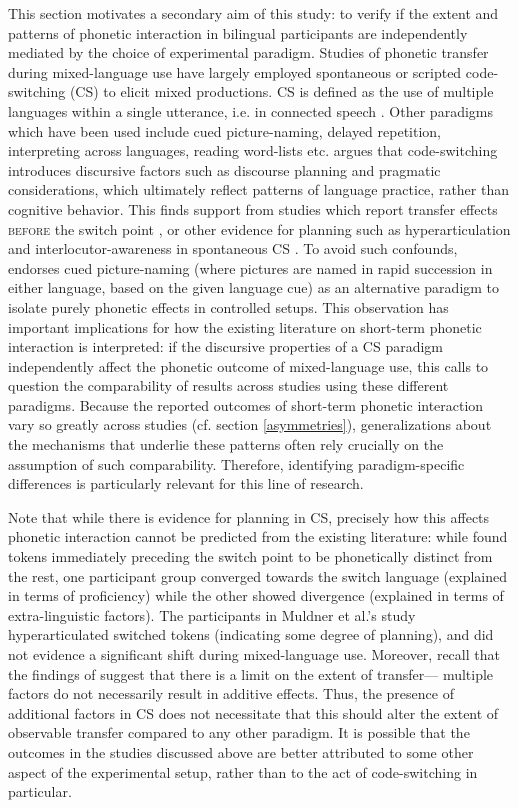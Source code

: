 \documentclass[12 pt]{article}
\begin{document}
This section motivates a secondary aim of this study: to verify if the extent and patterns of phonetic interaction in bilingual participants are independently mediated by the choice of experimental paradigm. Studies of phonetic transfer during mixed-language use have largely employed spontaneous or scripted code-switching (CS) to elicit mixed productions. CS is defined as the use of multiple languages within a single utterance, i.e. in connected speech \citep{myers1993dueling}. Other paradigms which have been used include cued picture-naming, delayed repetition, interpreting across languages, reading word-lists etc. \cite{olson2013bilingual} argues that code-switching introduces discursive factors such as discourse planning and pragmatic considerations, which ultimately reflect patterns of language practice, rather than cognitive behavior. This finds support from studies which report transfer effects \textsc{before} the switch point \citep{bullock2009trying}, or other evidence for planning such as hyperarticulation \citep{muldner2019phonetics} and interlocutor-awareness in spontaneous CS \citep{khattab2013phonetic}. To avoid such confounds, \cite{olson2013bilingual} endorses cued picture-naming (where pictures are named in rapid succession in either language, based on the given language cue) as an alternative paradigm to isolate purely phonetic effects in controlled setups. This observation has important implications for how the existing literature on short-term phonetic interaction is interpreted: if the discursive properties of a CS paradigm independently affect the phonetic outcome of mixed-language use, this calls to question the comparability of results across studies using these different paradigms. Because the reported outcomes of short-term phonetic interaction vary so greatly across studies (cf. section \ref{asymmetries}), generalizations about the mechanisms that underlie these patterns often rely crucially on the assumption of such comparability. Therefore, identifying paradigm-specific differences is particularly relevant for this line of research.

Note that while there is evidence for planning in CS, precisely how this affects phonetic interaction cannot be predicted from the existing literature: while \cite{bullock2009trying} found tokens immediately preceding the switch point to be phonetically distinct from the rest, one participant group converged towards the switch language (explained in terms of proficiency) while the other showed divergence (explained in terms of extra-linguistic factors). The participants in Muldner et al.'s \citeyearpar{muldner2019phonetics} study hyperarticulated switched tokens (indicating some degree of planning), and did not evidence a significant shift during mixed-language use. Moreover, recall that the findings of \cite{olson2016role} suggest that there is a limit on the extent of transfer--- multiple factors do not necessarily result in additive effects. Thus, the presence of additional factors in CS does not necessitate that this should alter the extent of observable transfer compared to any other paradigm. It is possible that the outcomes in the studies discussed above are better attributed to some other aspect of the experimental setup, rather than to the act of code-switching in particular.
\end{document}
